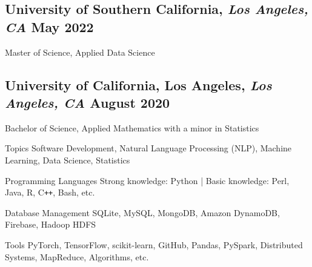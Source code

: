 \documentclass[11pt]{article}
\begin{document}

\vspace{0.1in}

\subsection*{University of Southern California{\normalfont, \textit{Los Angeles, CA} \hfill May 2022}}
\noindent
Master of Science, Applied Data Science

\subsection*{University of California, Los Angeles{\normalfont, \textit{Los Angeles, CA} \hfill August 2020}}
\noindent
Bachelor of Science, Applied Mathematics with a minor in Statistics

\vspace{0.1in}

\vspace{0.05in}
\begin{compactdesc}
	\item[Topics] Software Development, Natural Language Processing (NLP), Machine Learning, Data Science, Statistics
    \item[Programming Languages] Strong knowledge: Python | Basic knowledge: Perl, Java, R, C\texttt{++}, Bash, etc.
    \item[Database Management] SQLite, MySQL, MongoDB, Amazon DynamoDB, Firebase, Hadoop HDFS
    \item[Tools] PyTorch, TensorFlow, scikit-learn, GitHub, Pandas, PySpark, Distributed Systems, MapReduce, Algorithms, etc.
\end{compactdesc}
\end{document}
